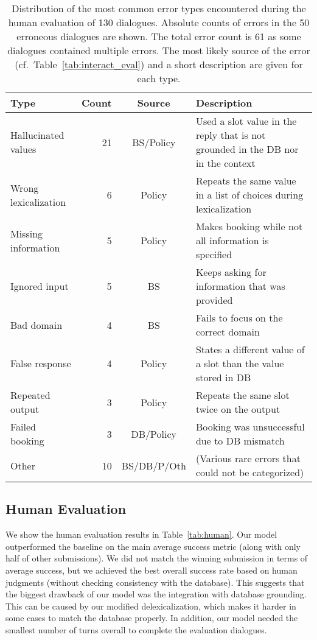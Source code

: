 \documentclass[11pt,a4paper]{article}
\begin{document}
\begin{table*}[t]
\centering\small
\begin{tabularx}{\textwidth}{lrcX}
\toprule
Type & Count & Source & Description \\
\midrule
Hallucinated values & 21 & BS/Policy & Used a slot value in the reply that is not grounded in the DB nor in the context \\
Wrong lexicalization & 6 & Policy & Repeats the same value in a list of choices during lexicalization  \\
Missing information & 5 & Policy & Makes booking while not all information is specified \\
Ignored input  & 5& BS & Keeps asking for information that was provided \\
Bad domain     & 4 & BS  & Fails to focus on the correct domain \\
False response & 4 & Policy & States a different value of a slot than the value stored in DB \\
Repeated output& 3 & Policy & Repeats the same slot twice on the output \\
Failed booking & 3 & DB/Policy & Booking was unsuccessful due to DB mismatch\\
Other          &10 & BS/DB/P/Oth & (Various rare errors that could not be categorized) \\
\bottomrule
\end{tabularx}
\caption{Distribution of the most common error types encountered during the human evaluation of 130 dialogues. Absolute counts of errors in the 50 erroneous dialogues are shown. The total error count is 61 as some dialogues contained multiple errors. The most likely source of the error (cf.~Table~\ref{tab:interact_eval}) and a short description are given for each type.}
\label{tab:detailed_eval}
\end{table*}

\subsection{Human Evaluation}

We show the human evaluation results in Table~\ref{tab:human}.
Our model outperformed the baseline on the main average success metric (along with only half of other submissions).
We did not match the winning submission in terms of average success, but we achieved the best overall success rate based on human judgments (without checking consistency with the database).
This suggests that the biggest drawback of our model was the integration with database grounding.
This can be caused by our modified delexicalization, which makes it harder in some cases to match the database properly.
In addition, our model needed the smallest number of turns overall to complete the evaluation dialogues.
\end{document}
